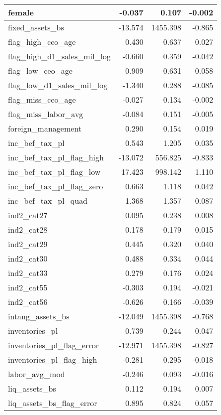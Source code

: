 \begin{table}
\begin{tabular}[t]{l|r|r|r}
female & -0.037 & 0.107 & -0.002\\
\hline
fixed\_assets\_bs & -13.574 & 1455.398 & -0.865\\
\hline
flag\_high\_ceo\_age & 0.430 & 0.637 & 0.027\\
\hline
flag\_high\_d1\_sales\_mil\_log & -0.660 & 0.359 & -0.042\\
\hline
flag\_low\_ceo\_age & -0.909 & 0.631 & -0.058\\
\hline
flag\_low\_d1\_sales\_mil\_log & -1.340 & 0.288 & -0.085\\
\hline
flag\_miss\_ceo\_age & -0.027 & 0.134 & -0.002\\
\hline
flag\_miss\_labor\_avg & -0.084 & 0.151 & -0.005\\
\hline
foreign\_management & 0.290 & 0.154 & 0.019\\
\hline
inc\_bef\_tax\_pl & 0.543 & 1.205 & 0.035\\
\hline
inc\_bef\_tax\_pl\_flag\_high & -13.072 & 556.825 & -0.833\\
\hline
inc\_bef\_tax\_pl\_flag\_low & 17.423 & 998.142 & 1.110\\
\hline
inc\_bef\_tax\_pl\_flag\_zero & 0.663 & 1.118 & 0.042\\
\hline
inc\_bef\_tax\_pl\_quad & -1.368 & 1.357 & -0.087\\
\hline
ind2\_cat27 & 0.095 & 0.238 & 0.008\\
\hline
ind2\_cat28 & 0.178 & 0.179 & 0.015\\
\hline
ind2\_cat29 & 0.445 & 0.320 & 0.040\\
\hline
ind2\_cat30 & 0.488 & 0.334 & 0.044\\
\hline
ind2\_cat33 & 0.279 & 0.176 & 0.024\\
\hline
ind2\_cat55 & -0.303 & 0.194 & -0.021\\
\hline
ind2\_cat56 & -0.626 & 0.166 & -0.039\\
\hline
intang\_assets\_bs & -12.049 & 1455.398 & -0.768\\
\hline
inventories\_pl & 0.739 & 0.244 & 0.047\\
\hline
inventories\_pl\_flag\_error & -12.971 & 1455.398 & -0.827\\
\hline
inventories\_pl\_flag\_high & -0.281 & 0.295 & -0.018\\
\hline
labor\_avg\_mod & -0.246 & 0.093 & -0.016\\
\hline
liq\_assets\_bs & 0.112 & 0.194 & 0.007\\
\hline
liq\_assets\_bs\_flag\_error & 0.895 & 0.824 & 0.057\\

\end{tabular}
\end{table}
